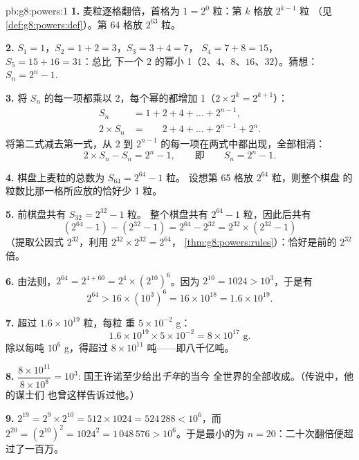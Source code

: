 \begin{solution}{pb:g8:powers:1}
\textbf{1.} 麦粒逐格翻倍，首格为
$1 = 2^0$ 粒：第 $k$ 格放 $2^{k-1}$ 粒
（见\cref{def:g8:powers:def}）。第 $64$ 格放 $2^{63}$ 粒。

\textbf{2.} $S_1 = 1$，$S_2 = 1 + 2 = 3$，$S_3 = 3 + 4 = 7$，
$S_4 = 7 + 8 = 15$，$S_5 = 15 + 16 = 31$：总比
下一个 $2$ 的幂小 1（$2$、$4$、$8$、$16$、$32$）。猜想：
$S_n = 2^n - 1$.

\textbf{3.} 将 $S_n$ 的每一项都乘以 2，每个幂的都增加
1（$2 \times 2^{k} = 2^{k+1}$）：
\begin{align*}
S_n &= 1 + 2 + 4 + \dots + 2^{n-1}, \\
2 \times S_n &= \phantom{1 + {}} 2 + 4 + \dots + 2^{n-1} + 2^n .
\end{align*}
将第二式减去第一式，从 $2$
到 $2^{n-1}$ 的每一项在两式中都出现，全部相消：
\[
2 \times S_n - S_n = 2^n - 1,
\qquad\text{即}\qquad
S_n = 2^n - 1 .
\]

\textbf{4.} 棋盘上麦粒的总数为 $S_{64} = 2^{64} - 1$ 粒。
设想第 65 格放 $2^{64}$ 粒，则整个棋盘
的粒数比那一格所应放的恰好少 1 粒。

\textbf{5.} 前棋盘共有 $S_{32} = 2^{32} - 1$ 粒。
整个棋盘共有 $2^{64} - 1$ 粒，因此后共有
\[
\left(2^{64} - 1\right) - \left(2^{32} - 1\right)
= 2^{64} - 2^{32}
= 2^{32} \times \left(2^{32} - 1\right)
\]
（提取公因式 $2^{32}$，利用 $2^{32} \times 2^{32} = 2^{64}$，
\cref{thm:g8:powers:rules}）：恰好是前的 $2^{32}$
倍。

\textbf{6.} 由法则，$2^{64} = 2^{4 + 60} =
2^4 \times \left(2^{10}\right)^6$。因为 $2^{10} = 1024 > 10^3$，于是有
\[
2^{64} > 16 \times \left(10^3\right)^6 = 16 \times 10^{18}
= 1.6 \times 10^{19} .
\]

\textbf{7.} 超过 $1.6 \times 10^{19}$ 粒，每粒
重 $5 \times 10^{-2}$ g：
\[
1.6 \times 10^{19} \times 5 \times 10^{-2}
= 8 \times 10^{17} \text{ g} .
\]
除以每吨 $10^6$ g，得超过 $8 \times 10^{11}$
吨——即八千亿吨。

\textbf{8.} $\dfrac{8 \times 10^{11}}{8 \times 10^{8}} = 10^3$:
国王许诺至少给出\emph{千年}的当今
全世界的全部收成。（传说中，他的谋士们
也曾这样告诉过他。）

\textbf{9.} $2^{19} = 2^9 \times 2^{10} = 512 \times 1024 =
524\,288 < 10^6$，而 $2^{20} = \left(2^{10}\right)^2 =
1024^2 = 1\,048\,576 > 10^6$。于是最小的为
$n = 20$：二十次翻倍便超过了一百万。


\end{solution}
